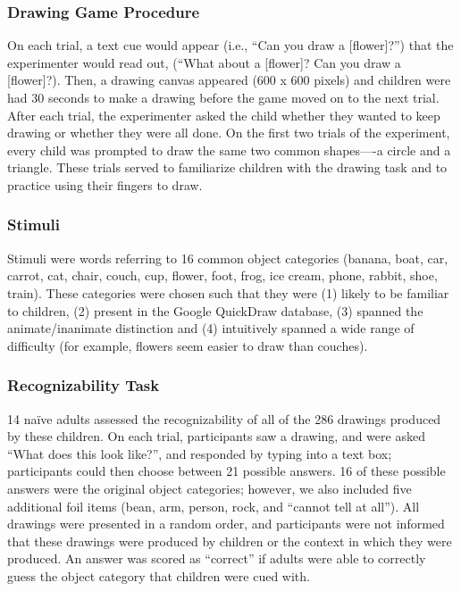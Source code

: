 \documentclass[10pt, letterpaper]{article}
\begin{document}
\subsubsection{Drawing Game Procedure}\label{drawing-game-procedure}

On each trial, a text cue would appear (i.e., ``Can you draw a
{[}flower{]}?'') that the experimenter would read out, (``What about a
{[}flower{]}? Can you draw a {[}flower{]}?). Then, a drawing canvas
appeared (600 x 600 pixels) and children were had 30 seconds to make a
drawing before the game moved on to the next trial. After each trial,
the experimenter asked the child whether they wanted to keep drawing or
whether they were all done. On the first two trials of the experiment,
every child was prompted to draw the same two common shapes----a circle
and a triangle. These trials served to familiarize children with the
drawing task and to practice using their fingers to draw.

\subsubsection{Stimuli}\label{stimuli}

Stimuli were words referring to 16 common object categories (banana,
boat, car, carrot, cat, chair, couch, cup, flower, foot, frog, ice
cream, phone, rabbit, shoe, train). These categories were chosen such
that they were (1) likely to be familiar to children, (2) present in the
Google QuickDraw database, (3) spanned the animate/inanimate distinction
and (4) intuitively spanned a wide range of difficulty (for example,
flowers seem easier to draw than couches).

\subsubsection{Recognizability Task}\label{recognizability-task}

14 naïve adults assessed the recognizability of all of the 286 drawings
produced by these children. On each trial, participants saw a drawing,
and were asked ``What does this look like?'', and responded by typing
into a text box; participants could then choose between 21 possible
answers. 16 of these possible answers were the original object
categories; however, we also included five additional foil items (bean,
arm, person, rock, and ``cannot tell at all''). All drawings were
presented in a random order, and participants were not informed that
these drawings were produced by children or the context in which they
were produced. An answer was scored as ``correct'' if adults were able
to correctly guess the object category that children were cued with.
\end{document}
